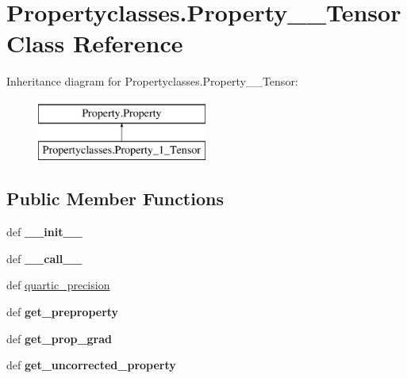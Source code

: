 \hypertarget{classPropertyclasses_1_1Property__1__Tensor}{\section{Propertyclasses.\+Property\+\_\+\_\+\+Tensor Class Reference}
\label{classPropertyclasses_1_1Property__1__Tensor}
}
Inheritance diagram for Propertyclasses.\+Property\+\_\+\_\+\+Tensor\+:\begin{figure}[H]
\begin{center}
\leavevmode
\includegraphics[height=2.000000cm]{classPropertyclasses_1_1Property__1__Tensor}
\end{center}
\end{figure}
\subsection*{Public Member Functions}
\begin{DoxyCompactItemize}
\item 
\hypertarget{classPropertyclasses_1_1Property__1__Tensor_a985c9f7efbd819f0352cee51dc444322}{def {\bfseries \+\_\+\+\_\+init\+\_\+\+\_\+}}\label{classPropertyclasses_1_1Property__1__Tensor_a985c9f7efbd819f0352cee51dc444322}

\item 
\hypertarget{classPropertyclasses_1_1Property__1__Tensor_a4b07ff551afb9b640b4de270fe127638}{def {\bfseries \+\_\+\+\_\+call\+\_\+\+\_\+}}\label{classPropertyclasses_1_1Property__1__Tensor_a4b07ff551afb9b640b4de270fe127638}

\item 
def \hyperlink{classPropertyclasses_1_1Property__1__Tensor_a8a824e2b788ed000e7ea13b2f1e2f2ce}{quartic\+\_\+precision}
\item 
\hypertarget{classPropertyclasses_1_1Property__1__Tensor_a978206dd0760d1428adc1bb8c47a8887}{def {\bfseries get\+\_\+preproperty}}\label{classPropertyclasses_1_1Property__1__Tensor_a978206dd0760d1428adc1bb8c47a8887}

\item 
\hypertarget{classPropertyclasses_1_1Property__1__Tensor_af11e9ed0dcad3c6216972ee31f04e28e}{def {\bfseries get\+\_\+prop\+\_\+grad}}\label{classPropertyclasses_1_1Property__1__Tensor_af11e9ed0dcad3c6216972ee31f04e28e}

\item 
\hypertarget{classPropertyclasses_1_1Property__1__Tensor_a975bb7a499b32983577c30aa37cc7356}{def {\bfseries get\+\_\+uncorrected\+\_\+property}}\label{classPropertyclasses_1_1Property__1__Tensor_a975bb7a499b32983577c30aa37cc7356}

\end{DoxyCompactItemize}
